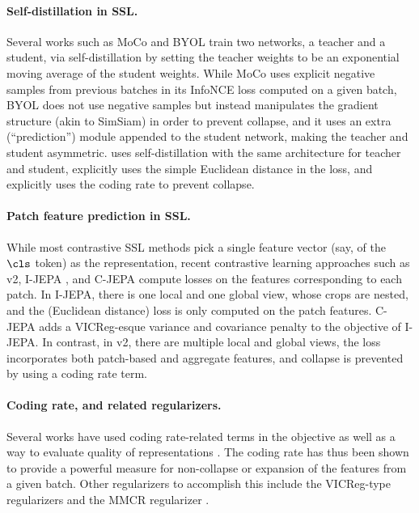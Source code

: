 \paragraph{Self-distillation in SSL.} Several works such as MoCo \citep{he2020momentum} and BYOL \citep{grill2020bootstrap} train two networks, a teacher and a student, via self-distillation by setting the teacher weights to be an exponential moving average of the student weights. While MoCo uses explicit negative samples from previous batches in its InfoNCE loss computed on a given batch, BYOL does not use negative samples but instead manipulates the gradient structure (akin to SimSiam) in order to prevent collapse, and it uses an extra (``prediction'') module appended to the student network, making the teacher and student asymmetric. \simdino{} uses self-distillation with the same architecture for teacher and student, explicitly uses the simple Euclidean distance in the loss, and explicitly uses the coding rate to prevent collapse.


\paragraph{Patch feature prediction in SSL.} While most contrastive SSL methods pick a single feature vector (say, of the \(\cls\) token) as the representation, recent contrastive learning approaches such as \dino{}v2, I-JEPA \citep{assran2023self}, and C-JEPA \citep{mo2024connecting} compute losses on the features corresponding to each patch. In I-JEPA, there is one local and one global view, whose crops are nested, and the (Euclidean distance) loss is only computed on the patch features. C-JEPA adds a VICReg-esque variance and covariance penalty to the objective of I-JEPA. In contrast, in \simdino{}v2, there are multiple local and global views, the loss incorporates both patch-based and aggregate features, and collapse is prevented by using a coding rate term.


\paragraph{Coding rate, and related regularizers.} Several works have used coding rate-related terms in the objective \citep{ma2007segmentation,yu2020learning,dai2022ctrl,tong2022unsupervised} as well as a way to evaluate quality of representations \citep{yu2023white,pai2023masked,wu2024token,yang2024scaling}. The coding rate has thus been shown to provide a powerful measure for non-collapse or expansion of the features from a given batch. Other regularizers to accomplish this include the VICReg-type regularizers and the MMCR regularizer \citep{yerxa2023learning,schaeffer2024towards}.